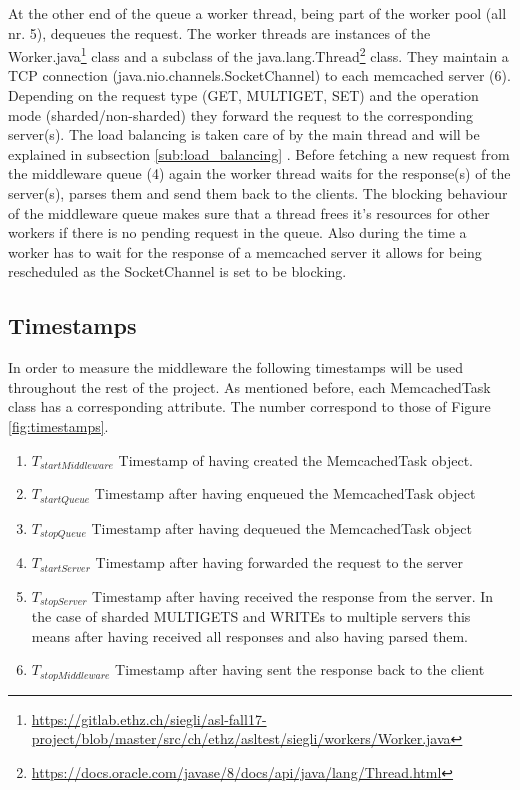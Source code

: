 \documentclass[11pt,a4paper]{article}
\begin{document}
At the other end of the queue a worker thread, being part of the worker pool (all nr. 5), dequeues the request. The worker threads are instances of the Worker.java\footnote{\url{https://gitlab.ethz.ch/siegli/asl-fall17-project/blob/master/src/ch/ethz/asltest/siegli/workers/Worker.java}} class and a subclass of the java.lang.Thread\footnote{\url{https://docs.oracle.com/javase/8/docs/api/java/lang/Thread.html}} class. They maintain a TCP connection (java.nio.channels.SocketChannel) to each memcached server (6). Depending on the request type (GET, MULTIGET, SET) and the operation mode (sharded/non-sharded) they forward the request to the corresponding server(s). The load balancing is taken care of by the main thread and will be explained in subsection \ref{sub:load_balancing} . Before fetching a new request from the middleware queue (4) again the worker thread waits for the response(s) of the server(s), parses them and send them back to the clients. The blocking behaviour of the middleware queue makes sure that a thread frees it's resources for other workers if there is no pending request in the queue. Also during the time a worker has to wait for the response of a memcached server it allows for being rescheduled as the SocketChannel is set to be blocking. 
\subsection{Timestamps}\label{sub:timestamps}

In order to measure the middleware the following timestamps will be used throughout the rest of the project. As mentioned before, each MemcachedTask class has a corresponding attribute. The number correspond to those of Figure \ref{fig:timestamps}.

\begin{enumerate}
\item $T_{startMiddleware}$  Timestamp of having created the MemcachedTask object.
\item $T_{startQueue}$  Timestamp after having enqueued the MemcachedTask object
\item $T_{stopQueue}$   Timestamp after having dequeued the MemcachedTask object
\item $T_{startServer}$  Timestamp after having forwarded the request to the server
\item $T_{stopServer}$  Timestamp after having received the response from the server. In the case of sharded MULTIGETS and WRITEs to multiple servers this means after having received all responses and also having parsed them.
\item $T_{stopMiddleware}$ Timestamp after having sent the response back to the client


\end{enumerate}
\end{document}
